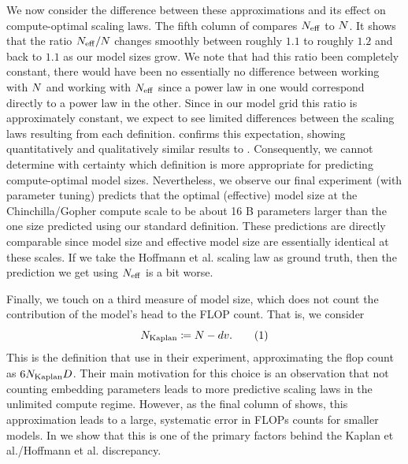\documentclass{article}
\makeatletter
\theoremstyle{plain}
\theoremstyle{definition}
\theoremstyle{remark}
\newcommand\numberthis{\addtocounter{equation}{1}\tag{\theequation}}
\newcommand{\defeq}{\coloneqq}
\newcommand{\maybeSubscript}[1]{
  \ifthenelse{\equal{#1}{}}{}{_{#1}}%
}
\newcommand{\Kaplan}{Kaplan et al.\@\xspace}
\newcommand{\Hoffmann}{Hoffmann et al.\@\xspace}
\newcommand{\params}[1][]{N\maybeSubscript{#1}}
\newcommand{\tokens}[1][]{D\maybeSubscript{#1}}
\newcommand{\paramsEff}{\params_{\mathrm{eff}}}
\newcommand{\paramsKaplan}{\params_{\mathrm{Kaplan}}}
\newcommand{\tentative}[1]{{\bf \color{red} #1}}
\renewcommand{\tentative}[1]{#1\xspace}
\makeatother
\begin{document}
We now consider the difference between these approximations and its effect on compute-optimal scaling laws. The fifth column of  compares $\paramsEff$ to $\params$. It shows that the ratio $\paramsEff/\params$ changes smoothly between roughly $1.1$ to roughly $1.2$ and back to $1.1$ as our model sizes grow. We note that had this ratio been completely constant, there would have been no essentially no difference between working with $\params$ and working with $\paramsEff$ since a power law in one would correspond directly to a power law in the other. Since in our model grid this ratio is approximately constant, we expect to see limited differences between the scaling laws resulting from each definition.  confirms this expectation, showing quantitatively and qualitatively similar results to . Consequently, we cannot determine with certainty which definition is more appropriate for predicting compute-optimal model sizes. Nevertheless, we observe our final experiment (with parameter tuning) \tentative{predicts} that the optimal (effective) model size at the Chinchilla/Gopher compute scale to be about \tentative{16}B parameters larger than the one size predicted using our standard definition. These predictions are directly comparable since model size and effective model size are essentially identical at these scales. If we take the \Hoffmann scaling law as ground truth, then the prediction we get using $\paramsEff$ is a bit worse. 

Finally, we touch on a third measure of model size, which does not count the contribution of the model's head to the FLOP count. That is, we consider
\[
    \paramsKaplan \defeq \params - dv.
    \numberthis
    \label{eq:N-kaplan-def}
\]
This is the definition that \citet{kaplan2020scaling} use in their experiment, approximating the flop count as $6\paramsKaplan\tokens$. Their main motivation for this choice is an observation that not counting embedding parameters leads to more predictive scaling laws in the unlimited compute regime. However, as the final column of  shows, this approximation leads to a large, systematic error in FLOPs counts for smaller models. In  we show that this is one of the primary factors behind the \Kaplan/\Hoffmann discrepancy.
\end{document}
